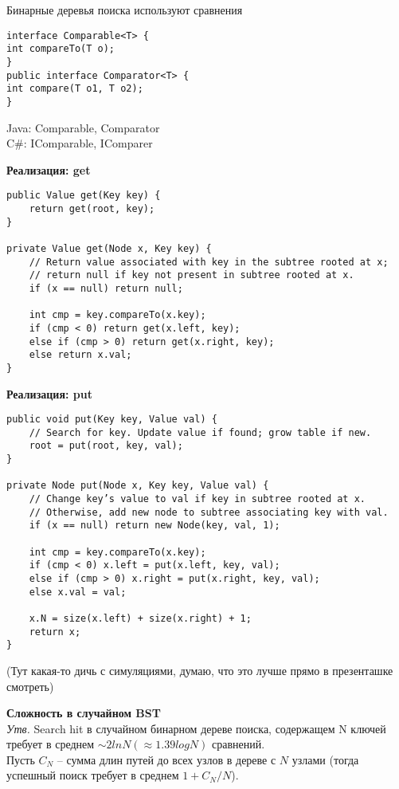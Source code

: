 Бинарные деревья поиска используют сравнения\\
\begin{verbatim}
interface Comparable<T> {
int compareTo(T o);
}
public interface Comparator<T> {
int compare(T o1, T o2);
}
\end{verbatim}

\noindent Java: Comparable, Comparator \\
C\#: IComparable, IComparer

{\bf Реализация: get}\\
\begin{verbatim}
public Value get(Key key) {
    return get(root, key);
}

private Value get(Node x, Key key) {
    // Return value associated with key in the subtree rooted at x;
    // return null if key not present in subtree rooted at x.
    if (x == null) return null;
    
    int cmp = key.compareTo(x.key);
    if (cmp < 0) return get(x.left, key);
    else if (cmp > 0) return get(x.right, key);
    else return x.val;
}
\end{verbatim}

{\bf Реализация: put}\\
\begin{verbatim}
public void put(Key key, Value val) {
    // Search for key. Update value if found; grow table if new.
    root = put(root, key, val);
}

private Node put(Node x, Key key, Value val) {
    // Change key’s value to val if key in subtree rooted at x.
    // Otherwise, add new node to subtree associating key with val.
    if (x == null) return new Node(key, val, 1);
    
    int cmp = key.compareTo(x.key);
    if (cmp < 0) x.left = put(x.left, key, val);
    else if (cmp > 0) x.right = put(x.right, key, val);
    else x.val = val;
    
    x.N = size(x.left) + size(x.right) + 1;
    return x;
}
\end{verbatim}


(Тут какая-то дичь с симуляциями, думаю, что это лучше прямо в презенташке смотреть)

{\bf Сложность в случайном BST}\\
\textit{Утв.} Search hit в случайном бинарном дереве поиска,
содержащем N ключей требует в среднем $\sim 2 ln N (\approx 1.39 log N)$ сравнений.\\
\vspace{3mm}
Пусть $C_N$ – сумма длин путей до всех узлов в дереве с $N$ узлами (тогда успешный поиск требует в среднем $1 + C_N /N$). \\


